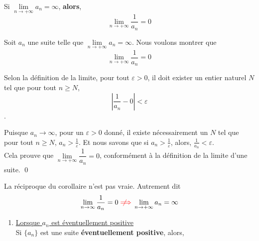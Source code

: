 \documentclass[16pt]{report}
\newcommand{\notimplies}{%
  \mathrel{{\ooalign{\hidewidth$\not\phantom{=}$\hidewidth\cr$\implies$}}}}
\begin{document}
\begin{multicols*}{2}
    \begin{corollary*}{}{}
       Si $\lim\limits_{n\to+\infty}a_n  = \infty$, \textbf{alors}, 
       \[ \lim\limits_{n\to+\infty}{\dfrac{1}{a_n}}  = 0  \]
   \end{corollary*} 
    

   \begin{Preuve}{}{}
        Soit \( a_n \) une suite telle que 
        \( \lim\limits_{n\to+\infty}a_n = \infty \). 
        Nous voulons montrer que 
        \[ \lim\limits_{n\to+\infty}\dfrac{1}{a_n} = 0 \]
        
        Selon la définition de la limite, pour tout \( \varepsilon > 0 \),
        il doit exister un entier naturel \( N \) tel que pour tout 
        \( n \geq N \), 
        \[ \left|\frac{1}{a_n} - 0\right| < \varepsilon \].
        
        Puisque \( a_n \to \infty \), pour un \( \varepsilon > 0 \) donné,
        il existe nécessairement un \( N \) tel que pour tout \( n \geq N \),
        \( a_n > \frac{1}{\varepsilon} \). Et nous savons que si 
        $a_n > \frac{1}{\varepsilon}$, alors,
        \( \frac{1}{a_n} < \varepsilon \).
        \vspace{1em}\\
        Cela prouve que 
        \( \lim\limits_{n\to+\infty}\dfrac{1}{a_n} = 0 \), 
        conformément à la définition de la limite d'une suite. \qed
    \end{Preuve}
    \begin{note}{}{}
        La réciproque du corollaire n'est pas vraie. Autrement dit  
        \begin{align*}
            \lim\limits_{n\to\infty}\frac{1}{a_n} = 0 
            \textcolor{red}{\notimplies}
            \lim\limits_{n\to+\infty}a_n  = \infty
        \end{align*}    
    \end{note}


    \columnbreak
    \begin{Lemme}{}{}

        \begin{enumerate}
            \item \underline{Lorsque $a_n$ est éventuellement positive}
                \vspace{1em}\\
                Si $\{ a_n \}$ est une suite 
                \textbf{éventuellement positive}, 
                alors,  


\end{enumerate}
\end{Lemme}
\end{multicols*}
\end{document}
